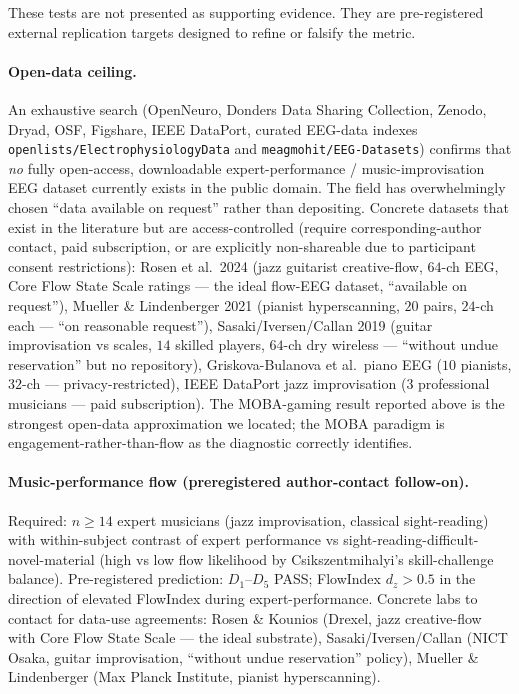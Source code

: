 \documentclass[11pt,a4paper]{article}
\begin{document}
These tests are not presented as supporting evidence. They are pre-registered external replication targets designed to refine or falsify the metric.

\paragraph{Open-data ceiling.} An exhaustive search (OpenNeuro, Donders Data Sharing Collection, Zenodo, Dryad, OSF, Figshare, IEEE DataPort, curated EEG-data indexes \texttt{openlists/ElectrophysiologyData} and \texttt{meagmohit/EEG-Datasets}) confirms that \emph{no} fully open-access, downloadable expert-performance / music-improvisation EEG dataset currently exists in the public domain. The field has overwhelmingly chosen ``data available on request'' rather than depositing. Concrete datasets that exist in the literature but are access-controlled (require corresponding-author contact, paid subscription, or are explicitly non-shareable due to participant consent restrictions): Rosen et al.\ 2024 (jazz guitarist creative-flow, $64$-ch EEG, Core Flow State Scale ratings --- the ideal flow-EEG dataset, ``available on request''), Mueller \& Lindenberger 2021 (pianist hyperscanning, $20$ pairs, $24$-ch each --- ``on reasonable request''), Sasaki/Iversen/Callan 2019 (guitar improvisation vs scales, $14$ skilled players, $64$-ch dry wireless --- ``without undue reservation'' but no repository), Griskova-Bulanova et al.\ piano EEG ($10$ pianists, $32$-ch --- privacy-restricted), IEEE DataPort jazz improvisation ($3$ professional musicians --- paid subscription). The MOBA-gaming result reported above is the strongest open-data approximation we located; the MOBA paradigm is engagement-rather-than-flow as the diagnostic correctly identifies.

\paragraph{Music-performance flow (preregistered author-contact follow-on).} Required: $n \geq 14$ expert musicians (jazz improvisation, classical sight-reading) with within-subject contrast of expert performance vs sight-reading-difficult-novel-material (high vs low flow likelihood by Csikszentmihalyi's skill-challenge balance). Pre-registered prediction: $D_1$--$D_5$ PASS; FlowIndex $d_z > 0.5$ in the direction of elevated FlowIndex during expert-performance. Concrete labs to contact for data-use agreements: Rosen \& Kounios (Drexel, jazz creative-flow with Core Flow State Scale --- the ideal substrate), Sasaki/Iversen/Callan (NICT Osaka, guitar improvisation, ``without undue reservation'' policy), Mueller \& Lindenberger (Max Planck Institute, pianist hyperscanning).
\end{document}
